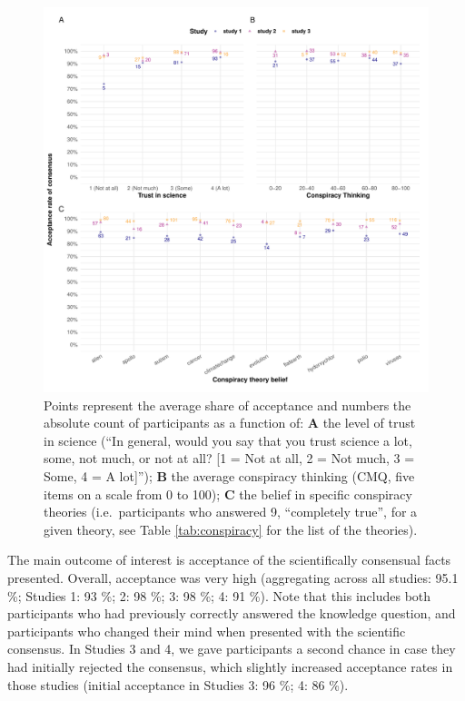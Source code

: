 \documentclass[
  doc,floatsintext]{apa6}
\begin{document}
\begin{figure}
\centering
\includegraphics{output/figures/summary-plot.pdf}
\caption{\label{fig:summary-plot}Points represent the average share of acceptance and numbers the absolute count of participants as a function of: \textbf{A} the level of trust in science (``In general, would you say that you trust science a lot, some, not much, or not at all? {[}1 = Not at all, 2 = Not much, 3 = Some, 4 = A lot{]}''); \textbf{B} the average conspiracy thinking (CMQ, five items on a scale from 0 to 100); \textbf{C} the belief in specific conspiracy theories (i.e.~participants who answered 9, ``completely true'', for a given theory, see Table \ref{tab:conspiracy} for the list of the theories).}
\end{figure}

The main outcome of interest is acceptance of the scientifically consensual facts presented. Overall, acceptance was very high (aggregating across all studies: 95.1 \%; Studies 1: 93 \%; 2: 98 \%; 3: 98 \%; 4: 91 \%). Note that this includes both participants who had previously correctly answered the knowledge question, and participants who changed their mind when presented with the scientific consensus. In Studies 3 and 4, we gave participants a second chance in case they had initially rejected the consensus, which slightly increased acceptance rates in those studies (initial acceptance in Studies 3: 96 \%; 4: 86 \%).
\end{document}
